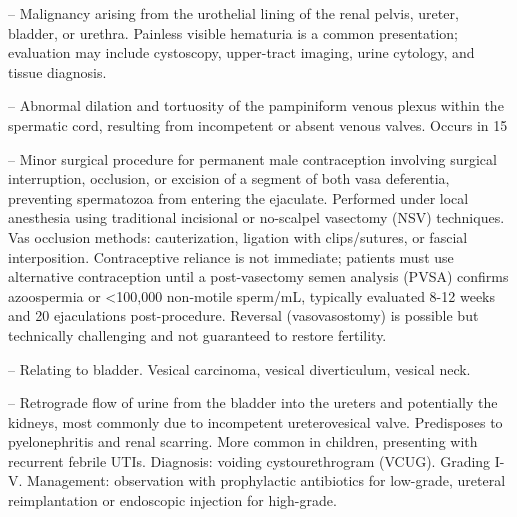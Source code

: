 -- Malignancy arising from the urothelial lining of the renal pelvis, ureter, bladder, or urethra. Painless visible hematuria is a common presentation; evaluation may include cystoscopy, upper-tract imaging, urine cytology, and tissue diagnosis.

-- Abnormal dilation and tortuosity of the pampiniform venous plexus within the spermatic cord, resulting from incompetent or absent venous valves. Occurs in 15%

-- Minor surgical procedure for permanent male contraception involving surgical interruption, occlusion, or excision of a segment of both vasa deferentia, preventing spermatozoa from entering the ejaculate. Performed under local anesthesia using traditional incisional or no-scalpel vasectomy (NSV) techniques. Vas occlusion methods: cauterization, ligation with clips/sutures, or fascial interposition. Contraceptive reliance is not immediate; patients must use alternative contraception until a post-vasectomy semen analysis (PVSA) confirms azoospermia or <100,000 non-motile sperm/mL, typically evaluated 8-12 weeks and 20 ejaculations post-procedure. Reversal (vasovasostomy) is possible but technically challenging and not guaranteed to restore fertility.

-- Relating to bladder. Vesical carcinoma, vesical diverticulum, vesical neck.

-- Retrograde flow of urine from the bladder into the ureters and potentially the kidneys, most commonly due to incompetent ureterovesical valve. Predisposes to pyelonephritis and renal scarring. More common in children, presenting with recurrent febrile UTIs. Diagnosis: voiding cystourethrogram (VCUG). Grading I-V. Management: observation with prophylactic antibiotics for low-grade, ureteral reimplantation or endoscopic injection for high-grade.

